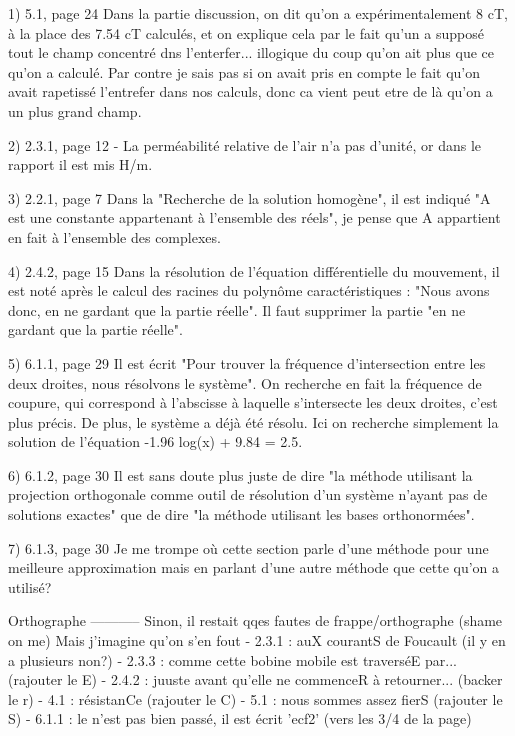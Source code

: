 
1) 5.1, page 24
Dans la partie discussion, on dit qu'on a expérimentalement 8 cT, à la place des 7.54 cT calculés, et on explique 
cela par le fait qu'un a supposé tout le champ concentré dns l'enterfer... illogique du coup qu'on ait plus que ce qu'on a calculé.
Par contre je sais pas si on avait pris en compte le fait qu'on avait rapetissé l'entrefer dans nos calculs, donc ca vient peut
etre de là qu'on a un plus grand champ.

2) 2.3.1, page 12
- La perméabilité relative de l'air n'a pas d'unité, or dans le rapport il est mis H/m.

3) 2.2.1, page 7
Dans la "Recherche de la solution homogène", il est indiqué "A est une constante appartenant
à l'ensemble des réels", je pense que A appartient en fait à l'ensemble des complexes.

4) 2.4.2, page 15
Dans la résolution de l'équation différentielle du mouvement, il est noté après le calcul
des racines du polynôme caractéristiques : "Nous avons donc, en ne gardant que la partie réelle".
Il faut supprimer la partie "en ne gardant que la partie réelle".

5) 6.1.1, page 29
Il est écrit "Pour trouver la fréquence d'intersection entre les deux droites, nous résolvons le système".
On recherche en fait la fréquence de coupure, qui correspond à l'abscisse à laquelle s'intersecte les
deux droites, c'est plus précis. De plus, le système a déjà été résolu. Ici on recherche simplement la
solution de l'équation -1.96 log(x) + 9.84 = 2.5.

6) 6.1.2, page 30
Il est sans doute plus juste de dire "la méthode utilisant la projection orthogonale comme outil
de résolution d'un système n'ayant pas de solutions exactes" que de dire "la méthode utilisant les
bases orthonormées".

7) 6.1.3, page 30
Je me trompe où cette section parle d'une méthode pour une meilleure approximation mais en parlant
d'une autre méthode que cette qu'on a utilisé?

Orthographe
-----------
Sinon, il restait qqes fautes de frappe/orthographe (shame on me) Mais j'imagine qu'on s'en fout
- 2.3.1 : auX courantS de Foucault (il y en a plusieurs non?)
- 2.3.3 : comme cette bobine mobile est traverséE par... (rajouter le E)
- 2.4.2 : juuste avant qu'elle ne commenceR à retourner... (backer le r)
- 4.1 : résistanCe (rajouter le C)
- 5.1 : nous sommes assez fierS (rajouter le S)
- 6.1.1 : le \vec n'est pas bien passé, il est écrit 'ecf2' (vers les 3/4 de la page)

